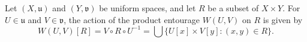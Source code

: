 \begin{proposition}
Let $(X, \mathfrak{u})$ and $(Y, \mathfrak{v})$ be uniform spaces, and let $R$ be a subset of $X \times Y$. For $U \in \mathfrak{u}$ and $V \in \mathfrak{v}$, the action of the product entourage $W(U, V)$ on $R$ is given by
\[
W(U, V)[R] = V \circ R \circ U^{-1} = \bigcup \{U[x] \times V[y] : (x, y) \in R\}.
\]
\end{proposition}
